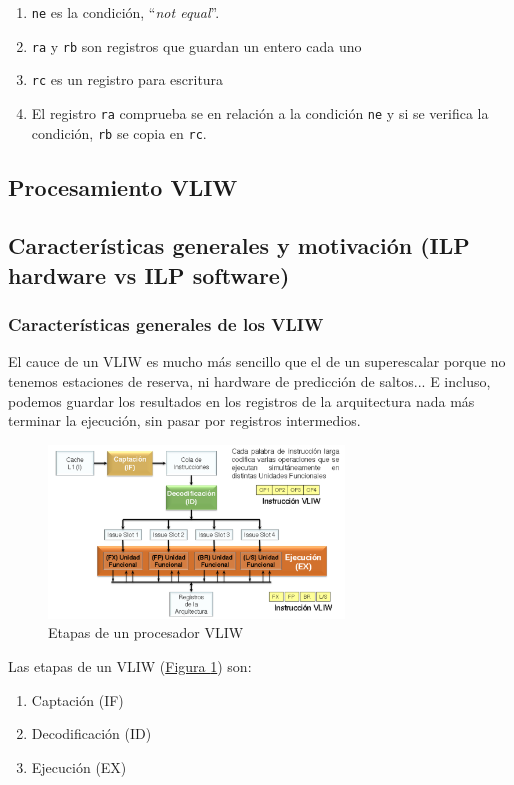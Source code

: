 \documentclass[10pt,a4paper,spanish]{report}
\begin{document}
\begin{enumerate}[---]
    \item \verb*|ne| es la condición, ``\textit{not equal}''. 
    \item \verb*|ra| y \verb*|rb| son registros que guardan un entero cada uno
    \item \verb*|rc| es un registro para escritura
    \item El registro \verb*|ra| comprueba se en relación a la condición \verb*|ne| y si se verifica la condición, \verb*|rb| se copia en \verb*|rc|.
\end{enumerate}

\textcolor{azul}{\section{Procesamiento VLIW}}
\textcolor{azul}{\subsection{Características generales y motivación (ILP hardware vs ILP software)}}
\textcolor{azul}{\subsubsection{Características generales de los VLIW}}
El cauce de un VLIW es mucho más sencillo que el de un superescalar porque no tenemos estaciones de reserva, ni hardware de predicción de saltos... E incluso, podemos guardar los resultados en los registros de la arquitectura nada más terminar la ejecución, sin pasar por registros intermedios.

\begin{figure}[!h]
\centering
\includegraphics[width=0.7\textwidth]{109}
\caption{Etapas de un procesador VLIW}
\label{etapas_vliw}
\end{figure}

Las etapas de un VLIW (\hyperref[etapas_vliw]{Figura \ref*{etapas_vliw}}) son:
\begin{enumerate}[\color{azul}{$\heartsuit$}]
    \item Captación (IF)
    \item Decodificación (ID)
    \item Ejecución (EX)
\end{enumerate}
\end{document}
